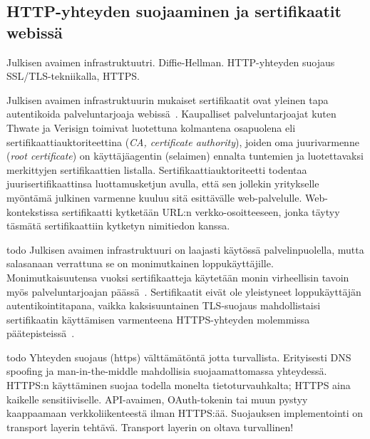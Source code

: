 \documentclass[finnish,gradu]{tktltiki}
\begin{document}



  \subsection{HTTP-yhteyden suojaaminen ja sertifikaatit webissä} %
  \label{sub:sertifikaatit_webissä}
  Julkisen avaimen infrastruktuutri.
  Diffie-Hellman.
  HTTP-yhteyden suojaus SSL/TLS-tekniikalla, HTTPS.

  Julkisen avaimen infrastruktuurin mukaiset sertifikaatit ovat yleinen tapa autentikoida palveluntarjoaja webissä~\cite{id_in_federation_systems_2005}. Kaupalliset palveluntarjoajat kuten Thwate ja Verisign toimivat luotettuna kolmantena osapuolena eli sertifikaattiauktoriteettina (\emph{CA, certificate authority}), joiden oma juurivarmenne (\emph{root certificate}) on käyttäjäagentin (selaimen) ennalta tuntemien ja luotettavaksi merkittyjen sertifikaattien listalla. Sertifikaattiauktoriteetti todentaa juurisertifikaattinsa luottamusketjun avulla, että sen jollekin yritykselle myöntämä julkinen varmenne kuuluu sitä esittävälle web-palvelulle. Web-kontekstissa sertifikaatti kytketään URL:n verkko-osoitteeseen, jonka täytyy täsmätä sertifikaattiin kytketyn nimitiedon kanssa.

  todo
  Julkisen avaimen infrastruktuuri on laajasti käytössä palvelinpuolella, mutta salasanaan verrattuna se on monimutkainen loppukäyttäjille. Monimutkaisuutensa vuoksi sertifikaatteja käytetään monin virheellisin tavoin myös palveluntarjoajan päässä~\cite{eff_ssliverse}. Sertifikaatit eivät ole yleistyneet loppukäyttäjän autentikointitapana, vaikka kaksisuuntainen TLS-suojaus mahdollistaisi sertifikaatin käyttämisen varmenteena HTTPS-yhteyden molemmissa päätepisteissä~\cite{henry_story_foaf_ssl, webid_home}.

  todo
  Yhteyden suojaus (https) välttämätöntä jotta turvallista. Erityisesti DNS spoofing ja man-in-the-middle mahdollisia suojaamattomassa yhteydessä.
  HTTPS:n käyttäminen suojaa todella monelta tietoturvauhkalta;
  HTTPS aina kaikelle sensitiiviselle. API-avaimen, OAuth-tokenin tai muun pystyy kaappaamaan verkkoliikenteestä ilman HTTPS:ää.  Suojauksen implementointi on transport layerin tehtävä. Transport layerin on oltava turvallinen!
\end{document}
